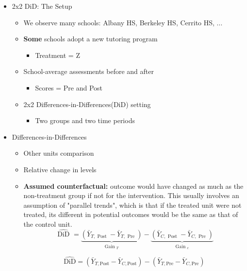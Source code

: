 \begin{itemize}
    \item 2x2 DiD: The Setup
        \begin{itemize}
            \item We observe many schools: Albany HS, Berkeley HS, Cerrito HS, ...
            \item \textbf{Some} schools adopt a new tutoring program
                \begin{itemize}
                    \item Treatment = Z
                \end{itemize}
            \item School-average assessments before and after
                \begin{itemize}
                    \item Scores = Pre and Post
                \end{itemize}
            \item 2x2 Differences-in-Differences(DiD) setting
                \begin{itemize}
                    \item Two groups and two time periods
                \end{itemize}
        \end{itemize}

    \item Differences-in-Differences
        \begin{itemize}
            \item Other units comparison
            \item Relative change in levels
            \item \textbf{Assumed counterfactual:} outcome would have changed as much as the non-treatment group if not for the intervention. This usually involves an assumption of  "parallel trends", which is that if the treated unit were not treated, its different in potential outcomes would be the same as that of the control unit.
            \[
\widehat{\text { DiD }}=\underbrace{\left(\bar{Y}_{T, \text { Post }}-\bar{Y}_{T, \text { Pre }}\right)}_{\text {Gain }_T}-\underbrace{\left(\bar{Y}_{C, \text { Post }}-\bar{Y}_{C, \text { Pre }}\right)}_{\text {Gain }_c}
\]

\[
\widehat{\text{DiD}} = (\bar{Y}_{T,\text{Post}} - \bar{Y}_{C,\text{Post}}) - (\bar{Y}_{T,\text{Pre}} - \bar{Y}_{C,\text{Pre}})
\]
        \end{itemize}
\end{itemize}

